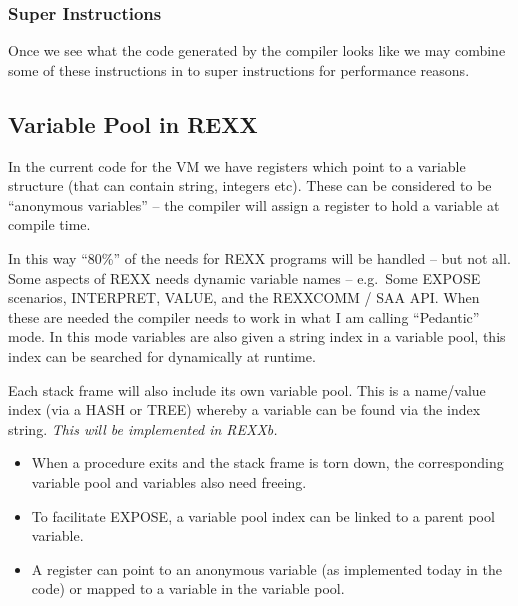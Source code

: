 \hypertarget{super-instructions}{%
\subsubsection{Super Instructions}\label{super-instructions}}

Once we see what the code generated by the compiler looks like we may
combine some of these instructions in to super instructions for
performance reasons.

\hypertarget{variable-pool-in-rexx}{%
\subsection{Variable Pool in REXX}\label{variable-pool-in-rexx}}

In the current code for the VM we have registers which point to a
variable structure (that can contain string, integers etc). These can be
considered to be ``anonymous variables'' -- the compiler will assign a
register to hold a variable at compile time.

In this way ``80\%'' of the needs for REXX programs will be handled --
but not all. Some aspects of REXX needs dynamic variable names --
e.g.~Some EXPOSE scenarios, INTERPRET, VALUE, and the REXXCOMM / SAA
API. When these are needed the compiler needs to work in what I am
calling ``Pedantic'' mode. In this mode variables are also given a
string index in a variable pool, this index can be searched for
dynamically at runtime.

Each stack frame will also include its own variable pool. This is a
name/value index (via a HASH or TREE) whereby a variable can be found
via the index string. \emph{This will be implemented in REXXb.}

\begin{itemize}
\tightlist
\item
  When a procedure exits and the stack frame is torn down, the
  corresponding variable pool and variables also need freeing.
\item
  To facilitate EXPOSE, a variable pool index can be linked to a parent
  pool variable.
\item
  A register can point to an anonymous variable (as implemented today in
  the code) or mapped to a variable in the variable pool.
\end{itemize}
